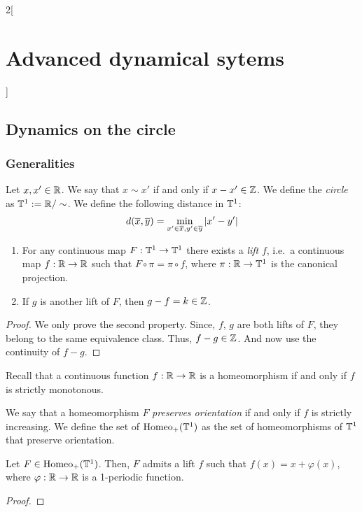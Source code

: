 \documentclass[../../../main_math.tex]{subfiles}
\begin{document}
\begin{multicols}{2}[\section{Advanced dynamical sytems}]
  \subsection{Dynamics on the circle}
  \subsubsection{Generalities}
  \begin{definition}
    Let $x,x'\in\mathbb{R}$. We say that $x\sim x'$ if and only if $x-x'\in\mathbb{Z}$. We define the \emph{circle} as $\TT^1:=\quot{\RR}{\sim}$. We define the following distance in $\mathbb{T}^1$:
    $$
      d(\overline{x},\overline{y})=\min_{x'\in\overline{x},y'\in\overline{y}}\abs{x'-y'}
    $$
  \end{definition}
  \begin{proposition}\hfill
    \begin{enumerate}
      \item For any continuous map $F:\mathbb{T}^1\to \mathbb{T}^1$ there exists a \emph{lift} $f$, i.e.\ a continuous map $f:\mathbb{R}\to \mathbb{R}$ such that $F\circ \pi=\pi\circ f$, where $\pi:\mathbb{R}\to\mathbb{T}^1$ is the canonical projection.
      \item If $g$ is another lift of $F$, then $g-f=k\in\mathbb{Z}$.
    \end{enumerate}
  \end{proposition}
  \begin{proof}
    We only prove the second property. Since, $f$, $g$ are both lifts of $F$, they belong to the same equivalence class. Thus, $f-g\in\mathbb{Z}$. And now use the continuity of $f-g$.
  \end{proof}
  \begin{remark}
    Recall that a continuous function $f:\mathbb{R}\to\mathbb{R}$ is a homeomorphism if and only if $f$ is strictly monotonous.
  \end{remark}
  \begin{definition}
    We say that a homeomorphism $F$ \emph{preserves orientation} if and only if $f$ is strictly increasing. We define the set of $\mathrm{Homeo}_+(\mathbb{T}^1)$ as the set of homeomorphisms of $\mathbb{T}^1$ that preserve orientation.
  \end{definition}
  \begin{proposition}\label{ADS:prop_lift}
    Let $F\in\mathrm{Homeo}_+(\mathbb{T}^1)$. Then, $F$ admits a lift $f$ such that $f(x)=x+\varphi(x)$, where $\varphi:\mathbb{R}\to\mathbb{R}$ is a 1-periodic function.
  \end{proposition}
  \begin{proof}

\end{proof}
\end{multicols}
\end{document}
